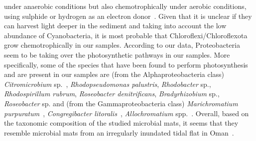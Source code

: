    under anaerobic conditions but also chemotrophically under aerobic conditions, 
   using sulphide or hydrogen as an electron donor~\citep{tang_complete_2011, kawai_hydrogen-dependent_2019, kawai_-situ_2021}. 
   Given that it is unclear if they can harvest light deeper in the sediment and taking into account 
   the low abundance of Cyanobacteria, it is most probable that Chloroflexi/Chloroflexota grow chemotrophically in our samples. 
   According to our data, Proteobacteria seem to be taking over the photosynthetic pathways in our samples. 
   More specifically, some of the species that have been found to perform photosynthesis and are present in our samples are
   (from the Alphaproteobacteria class) \textit{Citromicrobium} sp.~\citep{jiao_coexistence_2010}, 
   \textit{Rhodopseudomonas palustris}, \textit{Rhodobacter} sp., \textit{Rhodospirillum rubrum}, 
   \textit{Roseobacter denitrificans}, \textit{Bradyrhizobium} sp., \textit{Roseobacter} sp. 
   \citep{larimer_complete_2004, bryant_prokaryotic_2006}
   and (from the Gammaproteobacteria class) 
   \textit{Marichromatium purpuratum}~\citep{shiung_photosynthetic_2018}, 
   \textit{Congregibacter litoralis}~\citep{fuchs_characterization_2007, spring_photosynthetic_2009}, 
   \textit{Allochromatium} spp.~\citep{kyndt_genome_2020}. 
   Overall, based on the taxonomic composition of the studied microbial mats, 
   it seems that they resemble microbial mats from an irregularly inundated tidal flat in Oman~\citep{meier_limitation_2021}.


